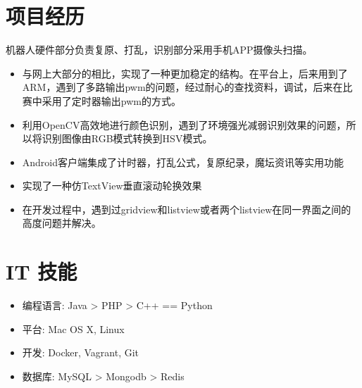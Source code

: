 \documentclass{resume}
\begin{document}
\pagestyle{empty}

\section{项目经历}
\begin{onehalfspacing}
机器人硬件部分负责复原、打乱，识别部分采用手机APP摄像头扫描。
\begin{itemize}
  \item 与网上大部分的相比，实现了一种更加稳定的结构。在平台上，后来用到了ARM，遇到了多路输出pwm的问题，经过耐心的查找资料，调试，后来在比赛中采用了定时器输出pwm的方式。
  \item 利用OpenCV高效地进行颜色识别，遇到了环境强光减弱识别效果的问题，所以将识别图像由RGB模式转换到HSV模式。
  \item Android客户端集成了计时器，打乱公式，复原纪录，魔坛资讯等实用功能
\end{itemize}
\end{onehalfspacing}

\begin{onehalfspacing}
\begin{itemize}
  \item {实现了一种仿TextView垂直滚动轮换效果}
  \item {在开发过程中，遇到过gridview和listview或者两个listview在同一界面之间的高度问题并解决。}
\end{itemize}
\end{onehalfspacing}

\section{IT 技能}
\begin{onehalfspacing}
\begin{itemize}[parsep=0.5ex]
  \item 编程语言: Java > PHP > C++ == Python
  \item 平台: Mac OS X, Linux
  \item 开发: Docker, Vagrant, Git
  \item 数据库: MySQL > Mongodb > Redis
\end{itemize}
\end{onehalfspacing}
\end{document}
